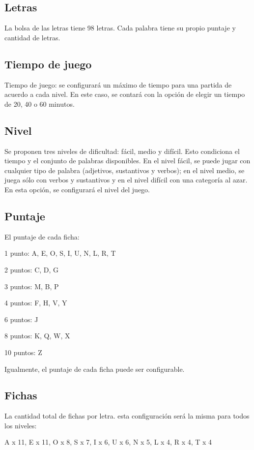 \documentclass[12pt]{article}
\begin{document}
\subsection{Letras}
La bolsa de las letras tiene 98 letras.
Cada palabra tiene su propio puntaje y cantidad de letras.
   
   
\subsection{Tiempo de juego}       

 Tiempo de juego: se configurará un máximo de tiempo para una partida de
 acuerdo a cada nivel.
 En este caso, se contará con la opción de elegir un tiempo de 20, 40 o 60 minutos.
 
\subsection{Nivel}
Se proponen tres niveles de dificultad: fácil, medio y difícil. Esto condiciona el tiempo y el conjunto de palabras disponibles.
En el nivel fácil, se puede jugar con cualquier tipo de palabra (adjetivos, sustantivos y verbos); en el nivel medio, se juega sólo con verbos y sustantivos y en el nivel difícil con una categoría al azar. En esta opción, se configurará el nivel del juego.


\subsection{Puntaje}
 El puntaje de cada ficha:
 
 1 punto: A, E, O, S, I, U, N, L, R, T

 2 puntos: C, D, G

 3 puntos: M, B, P

 4 puntos: F, H, V, Y

 6 puntos: J

 8 puntos: K, Q, W, X

 10 puntos: Z

Igualmente, el puntaje de cada ficha puede ser configurable.

\subsection{Fichas}

La cantidad total de fichas por letra. esta configuración será la misma para todos los niveles:

 A x 11, E x 11, O x 8, S x 7, I x 6, U x 6, N x 5, L x 4, R x 4, T x 4
    
\end{document}
